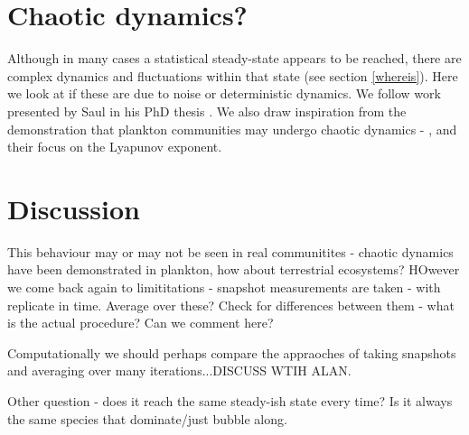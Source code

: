 
\newpage
\section{Chaotic dynamics?}
\label{sec:chaos}

Although in many cases a statistical steady-state appears to be reached, there are complex dynamics and fluctuations within that state (see section \ref{whereis}).  Here we look at if these are due to noise or deterministic dynamics. We follow work presented by Saul in his PhD thesis \cite{saul09phd}. We also draw inspiration from the demonstration that plankton communities may undergo chaotic dynamics - \cite{beninca2008chaos}, and their focus on the Lyapunov exponent.


\section{Discussion}

This behaviour may or may not be seen in real communitites - chaotic dynamics have been demonstrated in plankton, how about terrestrial ecosystems? HOwever we come back again to limititations - snapshot measurements are taken - with replicate in time. Average over these? Check for differences between them - what is the actual procedure? Can we comment here? 

Computationally we should perhaps compare the appraoches of taking snapshots and averaging over many iterations...DISCUSS WTIH ALAN.

Other question - does it reach the same steady-ish state every time? Is it always the same species that dominate/just bubble along.


